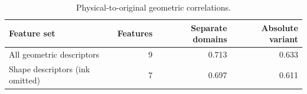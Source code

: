 \begin{table}[!htbp]\centering\small
\begin{tabular}{lrrr}\toprule
\textbf{Feature set} & \textbf{Features} & \textbf{Separate domains} & \textbf{Absolute variant}\\\midrule
All geometric descriptors & 9 & 0.713 & 0.633\\
Shape descriptors (ink omitted) & 7 & 0.697 & 0.611\\
\bottomrule\end{tabular}
\caption{Physical-to-original geometric correlations.}\label{tab:res-physical-style}
\end{table}
